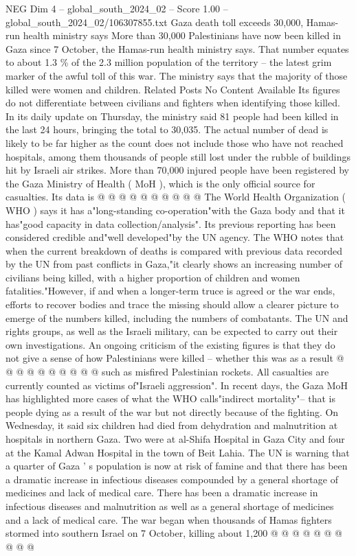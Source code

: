 \begin{textsample}{NEG Dim 4 – global\_south\_2024\_02 – Score 1.00 – global\_south\_2024\_02/106307855.txt}  \label{ex:f4_neg_381}
Gaza death toll exceeds 30,000, Hamas-run health ministry says More than 30,000 Palestinians have now been killed in Gaza since 7 October, the Hamas-run health ministry says.
That number equates to about 1.3 \% of the 2.3 million population of the territory -- the latest grim marker of the awful toll of this war.
The ministry says that the majority of those killed were women and children.
Related Posts No Content Available Its figures do not differentiate between civilians and fighters when identifying those killed.
In its daily update on Thursday, the ministry said 81 people had been killed in the last 24 hours, bringing the total to 30,035.
The actual number of dead is likely to be far higher as the count does not include those who have not reached hospitals, among them thousands of people still lost under the rubble of buildings hit by Israeli air strikes.
More than 70,000 injured people have been registered by the Gaza Ministry of Health ( MoH ), which is the only official source for casualties.
Its data is @ @ @ @ @ @ @ @ @ @ The World Health Organization ( WHO ) says it has a"long-standing co-operation"with the Gaza body and that it has"good capacity in data collection/analysis".
Its previous reporting has been considered credible and"well developed"by the UN agency.
The WHO notes that when the current breakdown of deaths is compared with previous data recorded by the UN from past conflicts in Gaza,"it clearly shows an increasing number of civilians being killed, with a higher proportion of children and women fatalities."However, if and when a longer-term truce is agreed or the war ends, efforts to recover bodies and trace the missing should allow a clearer picture to emerge of the numbers killed, including the numbers of combatants.
The UN and rights groups, as well as the Israeli military, can be expected to carry out their own investigations.
An ongoing criticism of the existing figures is that they do not give a sense of how Palestinians were killed -- whether this was as a result @ @ @ @ @ @ @ @ @ @ such as misfired Palestinian rockets.
All casualties are currently counted as victims of"Israeli aggression".
In recent days, the Gaza MoH has highlighted more cases of what the WHO calls"indirect mortality"-- that is people dying as a result of the war but not directly because of the fighting.
On Wednesday, it said six children had died from dehydration and malnutrition at hospitals in northern Gaza.
Two were at al-Shifa Hospital in Gaza City and four at the Kamal Adwan Hospital in the town of Beit Lahia.
The UN is warning that a quarter of Gaza ' s population is now at risk of famine and that there has been a dramatic increase in infectious diseases compounded by a general shortage of medicines and lack of medical care.
There has been a dramatic increase in infectious diseases and malnutrition as well as a general shortage of medicines and a lack of medical care.
The war began when thousands of Hamas fighters stormed into southern Israel on 7 October, killing about 1,200 @ @ @ @ @ @ @ @ @ @

\end{textsample}
